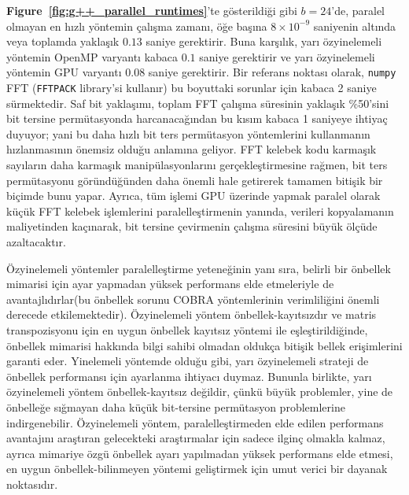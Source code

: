 \documentclass[10pt]{article}
\begin{document}
{\bf Figure~\ref{fig:g++_parallel_runtimes}}'te g\"{o}sterildi\u{g}i gibi 
$b=24$'de, paralel olmayan en h{\i}zl{\i} y\"{o}ntemin \c{c}al{\i}\c{s}ma zaman{\i}, 
\"{o}\u{g}e ba\c{s}{\i}na $8 \times {10}^{-9}$ saniyenin alt{\i}nda veya 
toplamda yakla\c{s}{\i}k $0.13$ saniye gerektirir. Buna kar\c{s}{\i}l{\i}k, 
yar{\i} \"{o}zyinelemeli y\"{o}ntemin OpenMP varyant{\i} kabaca $0.1$ saniye 
gerektirir ve yar{\i} \"{o}zyinelemeli y\"{o}ntemin GPU varyant{\i} $0.08$ saniye 
gerektirir. Bir referans noktas{\i} olarak, {\tt numpy} FFT 
({\tt FFTPACK} library'si kullan{\i}r) bu boyuttaki sorunlar i\c{c}in 
kabaca 2 saniye s\"{u}rmektedir. Saf bit yakla\c{s}{\i}m{\i}, toplam FFT 
\c{c}al{\i}\c{s}ma s\"{u}resinin yakla\c{s}{\i}k \%50'sini bit tersine perm\"{u}tasyonda 
harcanaca\u{g}{\i}ndan bu k{\i}s{\i}m kabaca 1 saniyeye ihtiya\c{c} duyuyor; 
yani bu daha h{\i}zl{\i} bit ters perm\"{u}tasyon y\"{o}ntemlerini 
kullanman{\i}n h{\i}zlanmas{\i}n{\i}n \"{o}nemsiz oldu\u{g}u anlam{\i}na geliyor. 
FFT kelebek kodu karma\c{s}{\i}k say{\i}lar{\i}n daha karma\c{s}{\i}k manip\"{u}lasyonlar{\i}n{\i} 
ger\c{c}ekle\c{s}tirmesine ra\u{g}men, bit ters perm\"{u}tasyonu 
g\"{o}r\"{u}nd\"{u}\u{g}\"{u}nden daha \"{o}nemli hale getirerek tamamen biti\c{s}ik bir 
bi\c{c}imde bunu yapar. Ayr{\i}ca, t\"{u}m i\c{s}lemi GPU \"{u}zerinde yapmak 
paralel olarak k\"{u}\c{c}\"{u}k FFT 
kelebek i\c{s}lemlerini paralelle\c{s}tirmenin yan{\i}nda, 
verileri kopyalaman{\i}n maliyetinden ka\c{c}{\i}narak, 
bit tersine \c{c}evirmenin \c{c}al{\i}\c{s}ma s\"{u}resini b\"{u}y\"{u}k \"{o}l\c{c}\"{u}de azaltacakt{\i}r.

\"{O}zyinelemeli y\"{o}ntemler paralelle\c{s}tirme yetene\u{g}inin yan{\i} s{\i}ra, 
belirli bir \"{o}nbellek mimarisi i\c{c}in ayar yapmadan y\"{u}ksek performans 
elde etmeleriyle de avantajl{\i}d{\i}rlar(bu \"{o}nbellek sorunu 
COBRA y\"{o}ntemlerinin verimlili\u{g}ini \"{o}nemli derecede etkilemektedir). 
\"{O}zyinelemeli y\"{o}ntem \"{o}nbellek-kay{\i}ts{\i}zd{\i}r ve matris transpozisyonu 
i\c{c}in en uygun \"{o}nbellek kay{\i}ts{\i}z y\"{o}ntemi\cite{prokop:cache} ile e\c{s}le\c{s}tirildi\u{g}inde, 
\"{o}nbellek mimarisi hakk{\i}nda bilgi sahibi olmadan olduk\c{c}a 
biti\c{s}ik bellek eri\c{s}imlerini garanti eder. Yinelemeli y\"{o}ntemde oldu\u{g}u gibi, 
yar{\i} \"{o}zyinelemeli strateji de \"{o}nbellek performans{\i} i\c{c}in ayarlanma 
ihtiyac{\i} duymaz. Bununla birlikte, yar{\i} \"{o}zyinelemeli y\"{o}ntem 
\"{o}nbellek-kay{\i}ts{\i}z de\u{g}ildir, \c{c}\"{u}nk\"{u} b\"{u}y\"{u}k problemler, yine de \"{o}nbelle\u{g}e 
s{\i}\u{g}mayan daha k\"{u}\c{c}\"{u}k bit-tersine perm\"{u}tasyon problemlerine indirgenebilir. 
\"{O}zyinelemeli y\"{o}ntem, paralelle\c{s}tirmeden elde edilen performans 
avantaj{\i}n{\i} ara\c{s}t{\i}ran gelecekteki ara\c{s}t{\i}rmalar i\c{c}in sadece ilgin\c{c} 
olmakla kalmaz, ayr{\i}ca mimariye \"{o}zg\"{u} \"{o}nbellek ayar{\i} yap{\i}lmadan 
y\"{u}ksek performans elde etmesi, en uygun \"{o}nbellek-bilinmeyen 
y\"{o}ntemi geli\c{s}tirmek i\c{c}in umut verici bir dayanak noktas{\i}d{\i}r.
\end{document}
